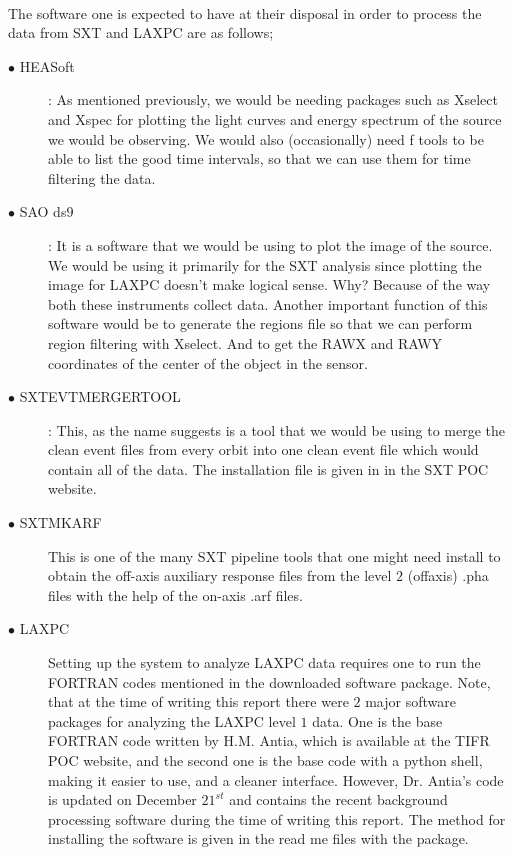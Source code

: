 \documentclass[a4paper,twoside]{report}
\numberwithin{equation}{section}
\begin{document}
\paragraph{}
The software one is expected to have at their disposal in order to process the data from SXT and LAXPC are as follows;
\begin{description}
\item[$\bullet$ HEASoft]: As mentioned previously, we would be needing packages such as Xselect and Xspec for plotting the light curves and energy spectrum of the source we would be observing. We would also (occasionally) need f tools to be able to list the good time intervals, so that we can use them for time filtering the data.
\item[$\bullet$ SAO ds$9$]: It is a software that we would be using to plot the image of the source. We would be using it primarily for the SXT analysis since plotting the image for LAXPC doesn’t make logical sense. Why? Because of the way both these instruments collect data. Another important function of this software would be to generate the regions file so that we can perform region filtering with Xselect. And to get the RAWX and RAWY coordinates of the center of the object in the sensor. 
\item[$\bullet$ SXTEVTMERGERTOOL]: This, as the name suggests is a tool that we would be using to merge the clean event files from every orbit into one clean event file which would contain all of the data. The installation file is given in in the SXT POC website.
\item[$\bullet$ SXTMKARF] This is one of the many SXT pipeline tools that one might need install to obtain the off-axis auxiliary response files from the level $2$ (offaxis) .pha files with the help of the on-axis .arf files. 
\item[$\bullet$ LAXPC] Setting up the system to analyze LAXPC data requires one to run the FORTRAN codes mentioned in the downloaded software package. Note, that at the time of writing this report there were $2$ major software packages for analyzing the LAXPC level $1$ data. One is the base FORTRAN code written by H.M. Antia, which is available at the TIFR POC website, and the second one is the base code with a python shell, making it easier to use, and a cleaner interface. However, Dr. Antia's code is updated on December $21^{st}$ and contains the recent background processing software during the time of writing this report. The method for installing the software is given in the read me files with the package. 
\end{description}
\end{document}
